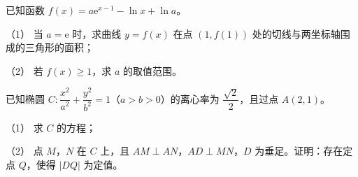 \begin{question}
已知函数 $f(x)=a\mathrm e^{x-1}-\ln x+\ln a$。

（1） 当 $a=\mathrm e$ 时，求曲线 $y=f(x)$ 在点 $(1,f(1))$ 处的切线与两坐标轴围成的三角形的面积；

（2） 若 $f(x)\geqslant1$，求 $a$ 的取值范围。

\end{question}
\begin{question}
已知椭圆 $C:\dfrac{x^2}{a^2}+\dfrac{y^2}{b^2}=1$（$a>b>0$）的离心率为 $\dfrac{\sqrt2}2$，且过点 $A(2,1)$。

（1） 求 $C$ 的方程；

（2） 点 $M$，$N$ 在 $C$ 上，且 $AM\perp AN$，$AD\perp MN$，$D$ 为垂足。证明：存在定点 $Q$，使得 $|DQ|$ 为定值。

\end{question}